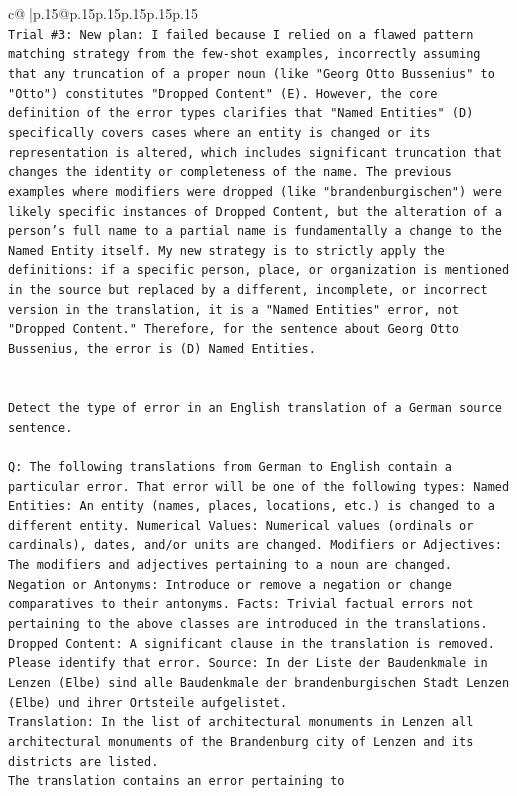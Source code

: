 \documentclass{article}
\begin{document}
{\begin{supertabular}{c@{$\;$}|p{.15\linewidth}@{}p{.15\linewidth}p{.15\linewidth}p{.15\linewidth}p{.15\linewidth}p{.15\linewidth}}
{{{\\ 
\texttt{Trial \#3: New plan: I failed because I relied on a flawed pattern matching strategy from the few{-}shot examples, incorrectly assuming that any truncation of a proper noun (like "Georg Otto Bussenius" to "Otto") constitutes "Dropped Content" (E). However, the core definition of the error types clarifies that "Named Entities" (D) specifically covers cases where an entity is changed or its representation is altered, which includes significant truncation that changes the identity or completeness of the name. The previous examples where modifiers were dropped (like "brandenburgischen") were likely specific instances of Dropped Content, but the alteration of a person's full name to a partial name is fundamentally a change to the Named Entity itself. My new strategy is to strictly apply the definitions: if a specific person, place, or organization is mentioned in the source but replaced by a different, incomplete, or incorrect version in the translation, it is a "Named Entities" error, not "Dropped Content." Therefore, for the sentence about Georg Otto Bussenius, the error is (D) Named Entities.} \\
\\ 
\\ 
\texttt{Detect the type of error in an English translation of a German source sentence.} \\
\\ 
\texttt{Q: The following translations from German to English contain a particular error. That error will be one of the following types: Named Entities: An entity (names, places, locations, etc.) is changed to a different entity. Numerical Values: Numerical values (ordinals or cardinals), dates, and/or units are changed. Modifiers or Adjectives: The modifiers and adjectives pertaining to a noun are changed. Negation or Antonyms: Introduce or remove a negation or change comparatives to their antonyms. Facts: Trivial factual errors not pertaining to the above classes are introduced in the translations. Dropped Content: A significant clause in the translation is removed. Please identify that error.  Source: In der Liste der Baudenkmale in Lenzen (Elbe) sind alle Baudenkmale der brandenburgischen Stadt Lenzen (Elbe) und ihrer Ortsteile aufgelistet.} \\
\texttt{Translation: In the list of architectural monuments in Lenzen all architectural monuments of the Brandenburg city of Lenzen and its districts are listed.} \\
\texttt{The translation contains an error pertaining to} \\
}}}
\end{supertabular}}
\end{document}
